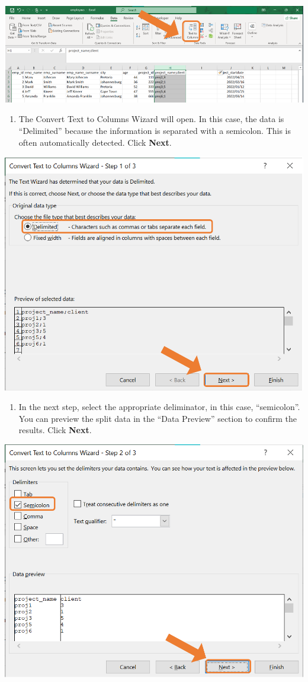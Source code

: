 \documentclass[
]{book}
\providecommand{\tightlist}{%
  \setlength{\itemsep}{0pt}\setlength{\parskip}{0pt}}
\begin{document}
\begin{center}\includegraphics[width=0.8\linewidth]{Figures/split_1} \end{center}

\begin{enumerate}
\def\labelenumi{\arabic{enumi}.}
\setcounter{enumi}{1}
\tightlist
\item
  The Convert Text to Columns Wizard will open. In this case, the data is ``Delimited'' because the information is separated with a semicolon. This is often automatically detected. Click \textbf{Next}.
\end{enumerate}

\begin{center}\includegraphics[width=0.6\linewidth]{Figures/split_2} \end{center}

\newpage

\begin{enumerate}
\def\labelenumi{\arabic{enumi}.}
\setcounter{enumi}{2}
\tightlist
\item
  In the next step, select the appropriate deliminator, in this case, ``semicolon''. You can preview the split data in the ``Data Preview'' section to confirm the results. Click \textbf{Next}.
\end{enumerate}

\begin{center}\includegraphics[width=0.6\linewidth]{Figures/split_3} \end{center}
\end{document}

